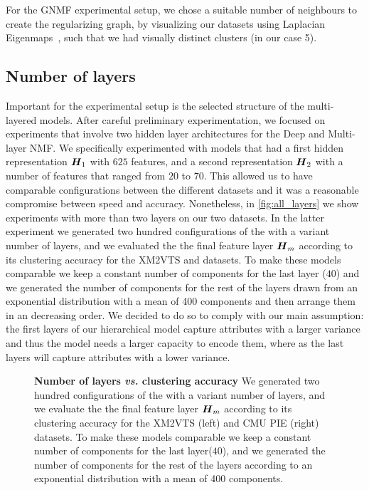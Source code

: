 \documentclass[10pt,journal,compsoc]{IEEEtran}
\begin{document}
For the GNMF experimental setup, we chose a suitable number of neighbours to create the regularizing graph, by visualizing our datasets using Laplacian Eigenmaps~\cite{belkin2001laplacian}, such that we had visually distinct clusters (in our case 5).



\subsection{Number of layers}

Important for the experimental setup is the selected structure of the multi-layered models. After careful preliminary experimentation, we focused on experiments that involve two hidden layer architectures for the Deep \seminmf and Multi-layer NMF. We specifically experimented with models that had a first hidden representation $\boldsymbol H_1$ with $625$ features, and a second representation $\boldsymbol H_2$ with a number of features that ranged from $20$ to $70$. This allowed us to have comparable configurations between the different datasets and it was a reasonable compromise between speed and accuracy. Nonetheless, in \autoref{fig:all_layers} we show experiments with more than two layers on our two datasets. In the latter experiment we generated two hundred configurations of the \deepseminmf with a variant number of layers, and we evaluated the the final feature layer $\boldsymbol{H}_m$ according to its clustering accuracy for the XM2VTS and \cmupie datasets. To make these models comparable we keep a constant number of components for the last layer ($40$) and we generated the number of components for the rest of the layers drawn from an exponential distribution with a mean of 400 components and then arrange them in an decreasing order. We decided to do so to comply with our main assumption: the first layers of our hierarchical model capture attributes with a larger variance and thus the model needs a larger capacity to encode them, where as the last layers will capture attributes with a lower variance. 

\begin{figure}[hpt]
\centering
{}
\caption{{\bfseries Number of layers \emph{vs.} clustering accuracy}
We generated two hundred configurations of the \deepseminmf with a variant number of layers, and we evaluate the the final feature layer $\boldsymbol{H}_m$ according to its clustering accuracy for the XM2VTS (left) and CMU PIE (right) datasets. To make these models comparable we keep a constant number of components for the last layer($40$), and we generated the number of components for the rest of the layers according to an exponential distribution with a mean of 400 components.}
\label{fig:all_layers}
\end{figure}
\end{document}
